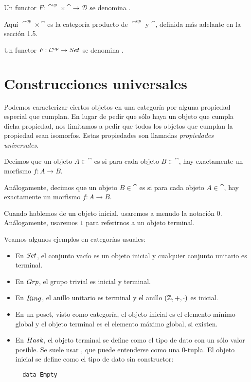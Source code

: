 \begin{definition}
Un functor $F \colon \cat^{op} \times \cat \to \mathcal{D}$ se denomina .
\end{definition}
Aquí $\cat^{op} \times \cat$ es la categoría producto de $\cat^{op}$ y $\cat$, definida más adelante en la sección 1.5.

\begin{definition}
Un functor $F \colon {\mathcal{C}}^{op} \to {Set}$ se denomina .
\end{definition}

\section{Construcciones universales}
Podemos caracterizar ciertos objetos en una categoría por alguna propiedad especial que cumplan. En lugar de pedir que sólo haya un objeto que cumpla dicha propiedad, nos limitamos a pedir que todos los objetos que cumplan la propiedad sean isomorfos. Estas propiedades son llamadas \emph{propiedades universales}.

\begin{definition}
Decimos que un objeto $A \in \cat$ es  si para cada objeto $B \in \cat$, hay exactamente un morfismo $f \colon A \to B$.

Análogamente, decimos que un objeto $B \in \cat$ es  si para cada objeto $A \in \cat$, hay exactamente un morfismo $f \colon A \to B$.
\end{definition}

Cuando hablemos de un objeto inicial, usaremos a menudo la notación $0$.
Análogamente, usaremos $1$ para referirnos a un objeto terminal.

\begin{example}
Veamos algunos ejemplos en categorías usuales:
\begin{itemize}
  \item En ${Set}$, el conjunto vacío es un objeto inicial y cualquier conjunto unitario es terminal.
  \item En ${Grp}$, el grupo trivial es inicial y terminal.
  \item En ${Ring}$, el anillo unitario es terminal y el anillo $({\mathbb{Z}},+,\cdot)$ es inicial.
  \item En un poset, visto como categoría, el objeto inicial es el elemento mínimo global y el objeto terminal es el elemento máximo global, si existen.
  \item En ${Hask}$, el objeto terminal se define como el tipo de dato con un sólo valor posible.
  Se suele usar \code{()}, que puede entenderse como una $0$-tupla.
  El objeto inicial se define como el tipo de dato sin constructor:
  \begin{verbatim}
  data Empty
  \end{verbatim}
\end{itemize}
\end{example}

